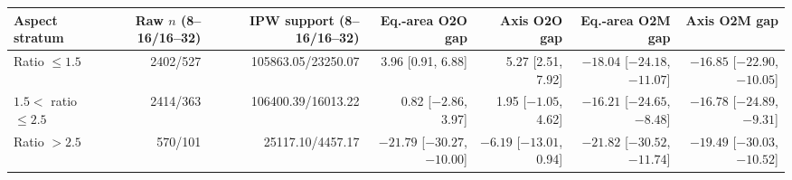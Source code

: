 \begin{tabular}{@{}lrrrrrr@{}}
\toprule
Aspect stratum & Raw $n$ (8--16/16--32) & IPW support (8--16/16--32) & Eq.-area O2O gap & Axis O2O gap & Eq.-area O2M gap & Axis O2M gap \\
\midrule
Ratio $\leq1.5$ & 2402/527 & 105863.05/23250.07 & 3.96 [0.91, 6.88] & 5.27 [2.51, 7.92] & $-18.04$ [$-24.18$, $-11.07$] & $-16.85$ [$-22.90$, $-10.05$] \\
$1.5<$ ratio $\leq2.5$ & 2414/363 & 106400.39/16013.22 & 0.82 [$-2.86$, 3.97] & 1.95 [$-1.05$, 4.62] & $-16.21$ [$-24.65$, $-8.48$] & $-16.78$ [$-24.89$, $-9.31$] \\
Ratio $>2.5$ & 570/101 & 25117.10/4457.17 & $-21.79$ [$-30.27$, $-10.00$] & $-6.19$ [$-13.01$, 0.94] & $-21.82$ [$-30.52$, $-11.74$] & $-19.49$ [$-30.03$, $-10.52$] \\
\bottomrule
\end{tabular}
